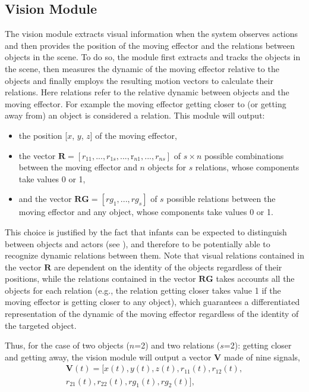 \documentclass[conference]{IEEEtran}
\begin{document}
\subsection{Vision Module}
The vision module extracts visual information when the system observes actions and then provides the position of the moving effector and the relations between objects in the scene. To do so, the module first extracts and tracks the objects in the scene, then measures the dynamic of the moving effector relative to the objects and finally employs the resulting motion vectors to calculate their relations. Here relations refer to the relative dynamic between objects and the moving effector. For example the moving effector getting closer to (or getting away from) an object is considered a relation. This module will output:
\begin{itemize}
\item the position [$x$, $y$, $z$] of the moving effector,
\item the vector \(\textbf{R}=[\textit{r}_{11},...,\textit{r}_{1s},...,\text{r}_{n1},...,\textit{r}_{ns}]\) of \(s \times n\) possible combinations between the moving effector and $n$ objects for $s$ relations, whose components take values 0 or 1,
\item and the vector \(\textbf{RG}=[\textit{rg}_{1},...,\textit{rg}_{s}]\) of $s$ possible relations between the moving effector and any object, whose components take values 0 or 1.
\end{itemize}

This choice is justified by the fact that infants can be expected to distinguish between objects and actors (see \cite{woodward1998infants}), and therefore to be potentially able to recognize dynamic relations between them. Note that visual relations contained in the vector $\textbf{R}$ are dependent on the identity of the objects regardless of their positions, while the relations contained in the vector $\textbf{RG}$ takes accounts all the objects for each relation (e.g., the relation getting closer takes value 1 if the moving effector is getting closer to any object), which guarantees a differentiated representation of the dynamic of the moving effector regardless of the identity of the targeted object.

Thus, for the case of two objects ($n$=2) and two relations ($s$=2): getting closer and getting away, the vision module will output a vector \(\textbf{V}\) made of nine signals,
\begin{equation}
\begin{split}
	\textbf{V}(t)=[\textit{x}(t), \textit{y}(t), \textit{z}(t), \textit{r}_{11}(t), \textit{r}_{12}(t),\\ \textit{r}_{21}(t), \textit{r}_{22}(t), \textit{rg}_{1}(t), \textit{rg}_{2}(t)],
\end{split}
\end{equation}
\end{document}
